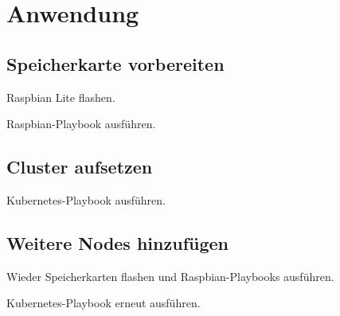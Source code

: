 \chapter{Anwendung}
\section{Speicherkarte vorbereiten}

Raspbian Lite flashen.

Raspbian-Playbook ausführen.

\section{Cluster aufsetzen}

Kubernetes-Playbook ausführen.

\section{Weitere Nodes hinzufügen}

Wieder Speicherkarten flashen und Raspbian-Playbooks ausführen.

Kubernetes-Playbook erneut ausführen.